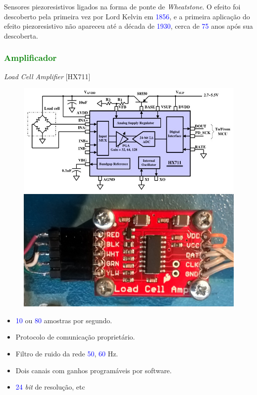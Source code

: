 \begin{frame}
\begin{figure}[!b]
\end{figure}
Sensores piezoresistivos ligados na forma de ponte de \textit{Wheatstone}.
\newline
\newline
O efeito foi descoberto pela primeira vez por Lord Kelvin em \textcolor{blue}{1856}, e a primeira aplicação do efeito piezoresistivo não apareceu até a década de \textcolor{blue}{1930}, cerca de \textcolor{blue}{75} anos após sua descoberta.
\end{frame}
\begin{frame}
\frametitle{\textcolor{green}{Amplificador}}
\textit{Load Cell Amplifier} [HX711]
\begin{figure}[H]
	\includegraphics[scale=0.25]{./image/PESTA/schematic/HX711_Schematic_1.jpg}
	\hspace{2cm}
	\includegraphics[scale=0.05]{./image/PESTA/material/HX711_board_1.jpg}
\end{figure}
\begin{itemize}
	\item \textcolor{blue}{10} ou \textcolor{blue}{80} amostras por segundo.
	\item Protocolo de comunicação proprietário.
	\item Filtro de ruido da rede \textcolor{blue}{50}, \textcolor{blue}{60} Hz.
	\item Dois canais com ganhos programáveis por software.
	\item \textcolor{blue}{24} \textit{bit} de resolução, etc
\end{itemize}
\end{frame}

